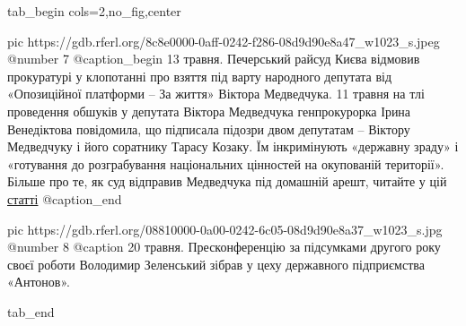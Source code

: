  
 
 
 
 


\ifcmt
  tab_begin cols=2,no_fig,center

		pic https://gdb.rferl.org/8c8e0000-0aff-0242-f286-08d9d90e8a47_w1023_s.jpeg
		@number 7
		@caption_begin
13 травня. Печерський райсуд Києва відмовив прокуратурі у клопотанні про взяття
під варту народного депутата від «Опозиційної платформи – За життя» Віктора
Медведчука. 11 травня на тлі проведення обшуків у депутата Віктора Медведчука генпрокурорка
Ірина Венедіктова повідомила, що підписала підозри двом депутатам – Віктору
Медведчуку і його соратнику Тарасу Козаку. Їм інкримінують «державну зраду» і
«готування до розграбування національних цінностей на окупованій території».
Більше про те, як суд відправив Медведчука під домашній арешт, читайте у цій
\href{https://www.radiosvoboda.org/a/news-sud-medvedchuk/31253770.html}{статті}
		@caption_end

		pic https://gdb.rferl.org/08810000-0a00-0242-6c05-08d9d90e8a37_w1023_s.jpg
		@number 8
		@caption 20 травня. Пресконференцію за підсумками другого року своєї роботи Володимир Зеленський зібрав у цеху державного підприємства «Антонов».

  tab_end
\fi


 
